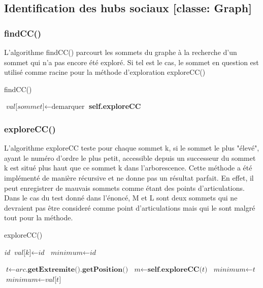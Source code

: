 \documentclass[a4paper]{article}
\begin{document}
\subsection{Identification des hubs sociaux [classe: Graph] }
\subsubsection{findCC()}
L'algorithme findCC() parcourt les sommets du graphe à la recherche d'un sommet qui n'a pas encore été  exploré. Si tel est le cas, le sommet en question est utilisé comme racine pour la méthode d'exploration exploreCC()
\begin{algorithm}[H]
\caption{findCC()}\label{findCC}
\begin{algorithmic}[1]
\State $\textit{val[sommet]}\gets \text{demarquer}$
\EndFor
{}
\State \textbf{self.exploreCC}
\EndIf
\EndFor
\EndProcedure
\end{algorithmic}
\end{algorithm}
\subsubsection{exploreCC()}
L'algorithme exploreCC teste pour chaque sommet k, si le sommet le plus "élevé", ayant le numéro d'ordre le plus petit, accessible depuis un successeur du sommet k est situé plus haut que ce sommet k dans l'arborescence. Cette méthode a été implémenté de manière récursive et ne donne pas un résultat parfait. En effet, il peut enregistrer de mauvais sommets comme étant des points d'articulations. Dans le cas du test donné dans l'énoncé, M et L sont deux sommets qui ne devraient pas être consideré comme point d'articulations mais qui le sont malgré tout pour la méthode.
\begin{algorithm}[H]
\caption{exploreCC()}\label{exploreCC}
\begin{algorithmic}[1]
\State {} \textit{id}
\State $\textit{val[k]}\gets \textit{id}$
\State $\textit{minimum}\gets \textit{id}$


\State $\textit{t}\gets \textit{arc}\textbf{.getExtremite().getPosition()}$
\State $\textit{m}\gets \textbf{self.exploreCC}\text{(}\textit{t}\text{)}$
\State $\textit{minimum}\gets \textit{t}$
\State {}
\EndIf
\EndIf
\Else
{}
\State $\textit{minimum}\gets \textit{val[t]}$
\EndIf
\EndIf
\EndFor
\State {}
\EndProcedure
\end{algorithmic}
\end{algorithm}
\end{document}
